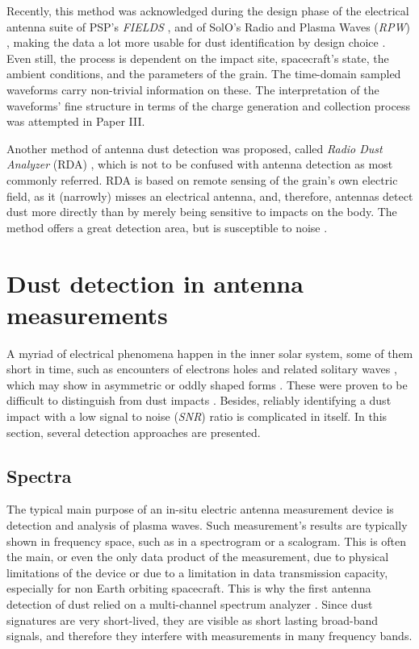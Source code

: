 Recently, this method was acknowledged during the design phase of the electrical antenna suite of PSP's \textit{FIELDS} \citep{bale2016fields}, and of SolO's Radio and Plasma Waves (\textit{RPW}) \citep{maksimovic2020solar}, making the data a lot more usable for dust identification by design choice \citep{mann2019dust}. Even still, the process is dependent on the impact site, spacecraft's state, the ambient conditions, and the parameters of the grain. The time-domain sampled waveforms carry non-trivial information on these. The interpretation of the waveforms' fine structure in terms of the charge generation and collection process was attempted in Paper III. 

Another method of antenna dust detection was proposed, called \textit{Radio Dust Analyzer} (RDA) \citep{lesceux1989electric}, which is not to be confused with antenna detection as most commonly referred. RDA is based on remote sensing of the grain's own electric field, as it (narrowly) misses an electrical antenna, and, therefore, antennas detect dust more directly than by merely being sensitive to impacts on the body. The method offers a great detection area, but is susceptible to noise \citep{meuris1996detection,meyer2001detecting}. 


\section{Dust detection in antenna measurements}

A myriad of electrical phenomena happen in the inner solar system, some of them short in time, such as encounters of electrons holes and related solitary waves \citep{malaspina2013electrostatic,steinvall2019multispacecraft}, which may show in asymmetric or oddly shaped forms \citep{pickett2004solitary}. These were proven to be difficult to distinguish from dust impacts \citep{malaspina2016database,vaverka2018comparison}. Besides, reliably identifying a dust impact with a low signal to noise (\textit{SNR}) ratio is complicated in itself. In this section, several detection approaches are presented.

\subsection{Spectra}

The typical main purpose of an in-situ electric antenna measurement device is detection and analysis of plasma waves. Such measurement's results are typically shown in frequency space, such as in a spectrogram or a scalogram. This is often the main, or even the only data product of the measurement, due to physical limitations of the device or due to a limitation in data transmission capacity, especially for non Earth orbiting spacecraft. This is why the first antenna detection of dust relied on a multi-channel spectrum analyzer \citep{scarf1982voyager}. Since dust signatures are very short-lived, they are visible as short lasting broad-band signals, and therefore they interfere with measurements in many frequency bands. 

